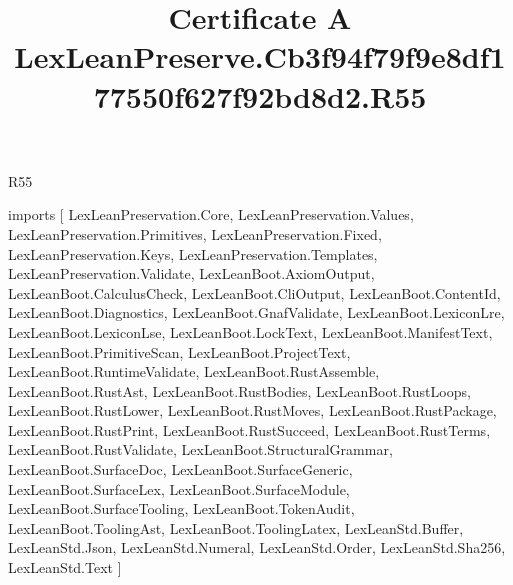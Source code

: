 \begin{lexlean}{R55}
\title{Certificate A LexLeanPreserve.Cb3f94f79f9e8df177550f627f92bd8d2.R55}
\begin{coremodule}
imports [
  LexLeanPreservation.Core,
  LexLeanPreservation.Values,
  LexLeanPreservation.Primitives,
  LexLeanPreservation.Fixed,
  LexLeanPreservation.Keys,
  LexLeanPreservation.Templates,
  LexLeanPreservation.Validate,
  LexLeanBoot.AxiomOutput,
  LexLeanBoot.CalculusCheck,
  LexLeanBoot.CliOutput,
  LexLeanBoot.ContentId,
  LexLeanBoot.Diagnostics,
  LexLeanBoot.GnafValidate,
  LexLeanBoot.LexiconLre,
  LexLeanBoot.LexiconLse,
  LexLeanBoot.LockText,
  LexLeanBoot.ManifestText,
  LexLeanBoot.PrimitiveScan,
  LexLeanBoot.ProjectText,
  LexLeanBoot.RuntimeValidate,
  LexLeanBoot.RustAssemble,
  LexLeanBoot.RustAst,
  LexLeanBoot.RustBodies,
  LexLeanBoot.RustLoops,
  LexLeanBoot.RustLower,
  LexLeanBoot.RustMoves,
  LexLeanBoot.RustPackage,
  LexLeanBoot.RustPrint,
  LexLeanBoot.RustSucceed,
  LexLeanBoot.RustTerms,
  LexLeanBoot.RustValidate,
  LexLeanBoot.StructuralGrammar,
  LexLeanBoot.SurfaceDoc,
  LexLeanBoot.SurfaceGeneric,
  LexLeanBoot.SurfaceLex,
  LexLeanBoot.SurfaceModule,
  LexLeanBoot.SurfaceTooling,
  LexLeanBoot.TokenAudit,
  LexLeanBoot.ToolingAst,
  LexLeanBoot.ToolingLatex,
  LexLeanStd.Buffer,
  LexLeanStd.Json,
  LexLeanStd.Numeral,
  LexLeanStd.Order,
  LexLeanStd.Sha256,
  LexLeanStd.Text
]


\end{coremodule}
\end{lexlean}
